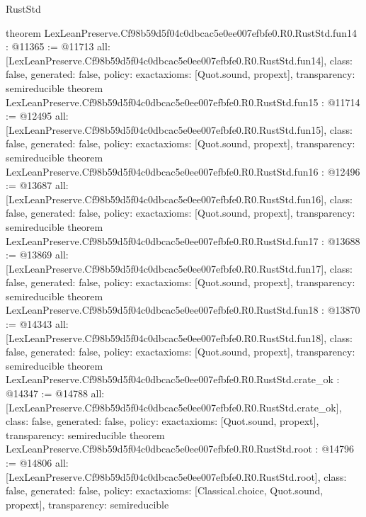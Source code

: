 \begin{lexlean}{RustStd}
\begin{coremodule}
{}
theorem LexLeanPreserve.Cf98b59d5f04c0dbcac5e0ee007efbfe0.R0.RustStd.fun14 : @11365 := @11713 {
  all: [LexLeanPreserve.Cf98b59d5f04c0dbcac5e0ee007efbfe0.R0.RustStd.fun14],
  class: false,
  generated: false,
  policy: exact{axioms: [Quot.sound, propext]},
  transparency: semireducible
}
theorem LexLeanPreserve.Cf98b59d5f04c0dbcac5e0ee007efbfe0.R0.RustStd.fun15 : @11714 := @12495 {
  all: [LexLeanPreserve.Cf98b59d5f04c0dbcac5e0ee007efbfe0.R0.RustStd.fun15],
  class: false,
  generated: false,
  policy: exact{axioms: [Quot.sound, propext]},
  transparency: semireducible
}
theorem LexLeanPreserve.Cf98b59d5f04c0dbcac5e0ee007efbfe0.R0.RustStd.fun16 : @12496 := @13687 {
  all: [LexLeanPreserve.Cf98b59d5f04c0dbcac5e0ee007efbfe0.R0.RustStd.fun16],
  class: false,
  generated: false,
  policy: exact{axioms: [Quot.sound, propext]},
  transparency: semireducible
}
theorem LexLeanPreserve.Cf98b59d5f04c0dbcac5e0ee007efbfe0.R0.RustStd.fun17 : @13688 := @13869 {
  all: [LexLeanPreserve.Cf98b59d5f04c0dbcac5e0ee007efbfe0.R0.RustStd.fun17],
  class: false,
  generated: false,
  policy: exact{axioms: [Quot.sound, propext]},
  transparency: semireducible
}
theorem LexLeanPreserve.Cf98b59d5f04c0dbcac5e0ee007efbfe0.R0.RustStd.fun18 : @13870 := @14343 {
  all: [LexLeanPreserve.Cf98b59d5f04c0dbcac5e0ee007efbfe0.R0.RustStd.fun18],
  class: false,
  generated: false,
  policy: exact{axioms: [Quot.sound, propext]},
  transparency: semireducible
}
theorem LexLeanPreserve.Cf98b59d5f04c0dbcac5e0ee007efbfe0.R0.RustStd.crate_ok : @14347 := @14788 {
  all: [LexLeanPreserve.Cf98b59d5f04c0dbcac5e0ee007efbfe0.R0.RustStd.crate_ok],
  class: false,
  generated: false,
  policy: exact{axioms: [Quot.sound, propext]},
  transparency: semireducible
}
theorem LexLeanPreserve.Cf98b59d5f04c0dbcac5e0ee007efbfe0.R0.RustStd.root : @14796 := @14806 {
  all: [LexLeanPreserve.Cf98b59d5f04c0dbcac5e0ee007efbfe0.R0.RustStd.root],
  class: false,
  generated: false,
  policy: exact{axioms: [Classical.choice, Quot.sound, propext]},
  transparency: semireducible
}


\end{coremodule}
\end{lexlean}

